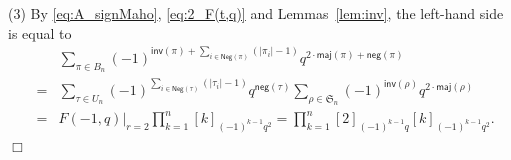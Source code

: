 \documentclass[a4paper, reqno, 11pt]{amsart}
\newcommand{\maj}{{\textsf{maj}}}
\newcommand{\inv}{{\textsf{inv}}}
\newcommand{\Nega}{{\textsf{Neg}}}
\newcommand{\nega}{{\textsf{neg}}}
\numberwithin{equation}{section}
\def\qed{\hspace*{\fill} $\Box$ \medskip}
\begin{document}
(3) By \eqref{eq:A_signMaho}, \eqref{eq:2_F(t,q)} and Lemmas~\ref{lem:inv}, the left-hand side is equal to
\begin{eqnarray*}
&&\sum_{\pi\in B_n}(-1)^{\inv(\pi)+\sum_{i\in\Nega(\pi)}(|\pi_i|-1)}q^{2\cdot\maj(\pi)+\nega(\pi)}\\
&=& \sum_{\tau\in U_n}(-1)^{\sum_{i\in\Nega(\tau)}(|\tau_i|-1)}q^{\nega(\tau)} \sum_{\rho\in \mathfrak{S}_n}(-1)^{\inv(\rho)}q^{2\cdot\maj(\rho)}\\
&=& F(-1,q)\Big|_{r=2}\prod_{k=1}^n[k]_{(-1)^{k-1}q^2} = \prod_{k=1}^n[2]_{(-1)^{k-1}q}[k]_{(-1)^{k-1}q^2}.
\end{eqnarray*}
\qed
\end{document}
